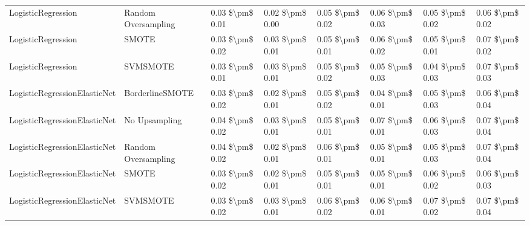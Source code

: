 \begin{tabular}{llllllll}
             LogisticRegression &           Random Oversampling & 0.03 \$\textbackslash pm\$ 0.01 &           0.02 \$\textbackslash pm\$ 0.00 &       0.05 \$\textbackslash pm\$ 0.02 &        0.06 \$\textbackslash pm\$ 0.03 &                         0.05 \$\textbackslash pm\$ 0.02 &     0.06 \$\textbackslash pm\$ 0.02 \\
             LogisticRegression &                         SMOTE & 0.03 \$\textbackslash pm\$ 0.02 &           0.03 \$\textbackslash pm\$ 0.01 &       0.05 \$\textbackslash pm\$ 0.01 &        0.06 \$\textbackslash pm\$ 0.02 &                         0.05 \$\textbackslash pm\$ 0.01 &     0.07 \$\textbackslash pm\$ 0.02 \\
             LogisticRegression &                      SVMSMOTE & 0.03 \$\textbackslash pm\$ 0.01 &           0.03 \$\textbackslash pm\$ 0.01 &       0.05 \$\textbackslash pm\$ 0.02 &        0.05 \$\textbackslash pm\$ 0.03 &                         0.04 \$\textbackslash pm\$ 0.03 &     0.07 \$\textbackslash pm\$ 0.03 \\
   LogisticRegressionElasticNet &               BorderlineSMOTE & 0.03 \$\textbackslash pm\$ 0.02 &           0.02 \$\textbackslash pm\$ 0.01 &       0.05 \$\textbackslash pm\$ 0.02 &        0.04 \$\textbackslash pm\$ 0.01 &                         0.05 \$\textbackslash pm\$ 0.03 &     0.06 \$\textbackslash pm\$ 0.04 \\
   LogisticRegressionElasticNet &                 No Upsampling & 0.04 \$\textbackslash pm\$ 0.02 &           0.03 \$\textbackslash pm\$ 0.01 &       0.05 \$\textbackslash pm\$ 0.01 &        0.07 \$\textbackslash pm\$ 0.01 &                         0.06 \$\textbackslash pm\$ 0.03 &     0.07 \$\textbackslash pm\$ 0.04 \\
   LogisticRegressionElasticNet &           Random Oversampling & 0.04 \$\textbackslash pm\$ 0.02 &           0.02 \$\textbackslash pm\$ 0.01 &       0.06 \$\textbackslash pm\$ 0.01 &        0.05 \$\textbackslash pm\$ 0.01 &                         0.05 \$\textbackslash pm\$ 0.03 &     0.07 \$\textbackslash pm\$ 0.04 \\
   LogisticRegressionElasticNet &                         SMOTE & 0.03 \$\textbackslash pm\$ 0.02 &           0.02 \$\textbackslash pm\$ 0.01 &       0.05 \$\textbackslash pm\$ 0.01 &        0.05 \$\textbackslash pm\$ 0.01 &                         0.06 \$\textbackslash pm\$ 0.02 &     0.06 \$\textbackslash pm\$ 0.03 \\
   LogisticRegressionElasticNet &                      SVMSMOTE & 0.03 \$\textbackslash pm\$ 0.02 &           0.03 \$\textbackslash pm\$ 0.01 &       0.06 \$\textbackslash pm\$ 0.02 &        0.06 \$\textbackslash pm\$ 0.01 &                         0.07 \$\textbackslash pm\$ 0.02 &     0.07 \$\textbackslash pm\$ 0.04 \\

\end{tabular}
